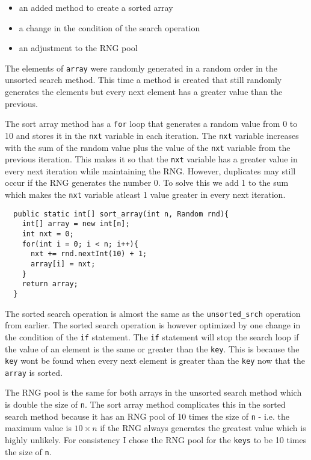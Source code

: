 \documentclass[a4paper,11pt]{article}
\begin{document}
\begin{itemize}
  \item an added method to create a sorted array
  
  \item a change in the condition of the search operation
  
  \item an adjustment to the RNG pool
\end{itemize}

The elements of {\tt array} were randomly generated in a random order 
in the unsorted search method. This time a method is created that 
still randomly generates the elements but every next element has a 
greater value than the previous.

The sort array method has a {\tt for} loop that generates a 
random value from 0 to 10 and stores it in the {\tt nxt} variable in 
each iteration. The {\tt nxt} variable increases with the sum of the
random value plus the value of the {\tt nxt} variable from the 
previous iteration. This makes it so that the {\tt nxt} variable has a 
greater value in every next iteration while maintaining the RNG. 
However, duplicates may still occur if the RNG generates the number 0. 
To solve this we add 1 to the sum which makes the {\tt nxt} variable 
atleast 1 value greater in every next iteration.

\begin{verbatim}
  public static int[] sort_array(int n, Random rnd){
    int[] array = new int[n];
    int nxt = 0;
    for(int i = 0; i < n; i++){
      nxt += rnd.nextInt(10) + 1;
      array[i] = nxt; 
    }
    return array;
  }
\end{verbatim}

The sorted search operation is almost the same as the
{\tt unsorted\_srch} operation from earlier. The sorted search 
operation is however optimized by one change in the condition of the 
{\tt if} statement. The {\tt if} statement will stop the search loop 
if the value of an element is the same or greater than the {\tt key}. 
This is because the {\tt key} wont be found when every next element is 
greater than the {\tt key} now that the {\tt array} is sorted.

The RNG pool is the same for both arrays in the unsorted search method
which is double the size of {\tt n}. The sort array method complicates
this in the sorted search method because it has an RNG pool of 10 times 
the size of {\tt n} - i.e. the maximum value is $ 10 \times n$ if the 
RNG always generates the greatest value which is highly unlikely. For
consistency I chose the RNG pool for the {\tt keys} to be 10 times the
size of {\tt n}.
\end{document}
